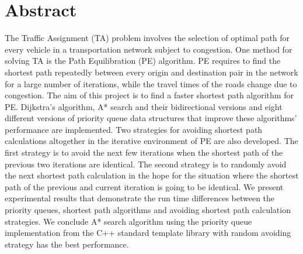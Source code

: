 \chapter*{Abstract}
\thispagestyle{empty}
The Traffic Assignment (TA) problem involves the selection of optimal path for every vehicle in a transportation network subject to congestion.
One method for solving TA is the Path Equilibration (PE) algorithm.
PE requires to find the shortest path repeatedly between every origin and destination pair in the network for a large number of iterations,
while the travel times of the roads change due to congestion.
The aim of this project is to find a faster shortest path algorithm for PE.
Dijkstra's algorithm, A* search and their bidirectional versions and eight different versions of priority queue data structures that improve these algorithms' performance are implemented.
Two strategies for avoiding shortest path calculations altogether in the iterative environment of PE are also developed.
The first strategy is to avoid the next few iterations when the shortest path of the previous two iterations are identical.
The second strategy is to randomly avoid the next shortest path calculation in the hope for the situation where the shortest path of the previous and current iteration is going to be identical.
We present experimental results that demonstrate the run time differences between the priority queues, shortest path algorithms and avoiding shortest path calculation strategies.
We conclude A* search algorithm using the priority queue implementation from the C++ standard template library with random avoiding strategy has the best performance.

